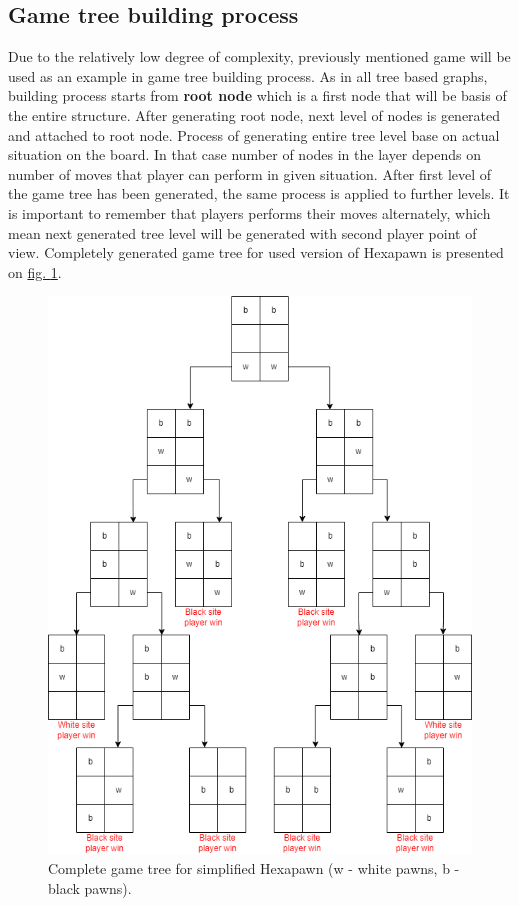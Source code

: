     \subsection{Game tree building process}
    Due to the relatively low degree of complexity, previously mentioned game will be used as an example in game tree building process. As in all tree based graphs, building process starts from \textbf{root node} which is a first node that will be basis of the entire structure. After generating root node, next level of nodes is generated and attached to root node. Process of generating entire tree level base on actual situation on the board. In that case number of nodes in the layer depends on number of moves that player can perform in given situation. After first level of the game tree has been generated, the same process is applied to further levels. It is important to remember that players performs their moves alternately, which mean next generated tree level will be generated with second player point of view. Completely generated game tree for used version of Hexapawn is presented on \hyperref[fig:complete-game-tree-hexapawn]{fig. \ref*{fig:complete-game-tree-hexapawn}}.
    \begin{figure}
        \centering
        \includegraphics[width=\textwidth]{dependencies/pictures/Complete_Game_Tree.png}
        \caption{Complete game tree for simplified Hexapawn (w - white pawns, b - black pawns).}
        \label{fig:complete-game-tree-hexapawn}
    \end{figure}
